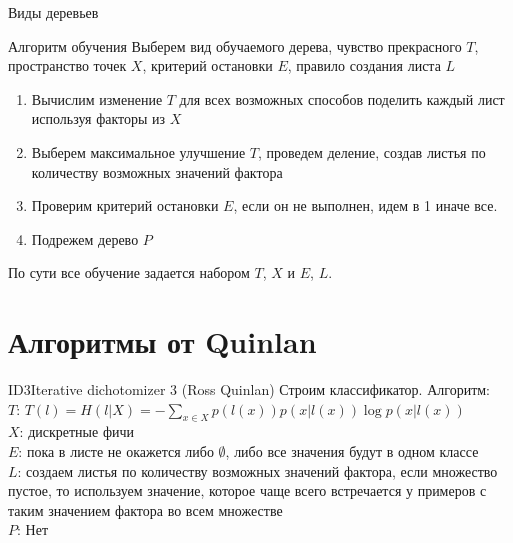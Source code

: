 \documentclass[14pt, fleqn, xcolor={dvipsnames, table}]{beamer}
\begin{document}
\begin{frame}{Виды деревьев}{}
\begin{center}
\end{center}
\end{frame}

\begin{frame}{Алгоритм обучения}
\small
Выберем вид обучаемого дерева, чувство прекрасного $T$, пространство точек $X$, критерий остановки $E$, правило создания листа $L$
\begin{enumerate}
  \item Вычислим изменение $T$ для всех возможных способов поделить каждый лист используя факторы из $X$
  \item Выберем максимальное улучшение $T$, проведем деление, создав листья по количеству возможных значений фактора
  \item Проверим критерий остановки $E$, если он не выполнен, идем в 1 иначе все.
  \item Подрежем дерево $P$
\end{enumerate}
По сути все обучение задается набором $T$, $X$ и $E$, $L$.
\end{frame}

\section{Алгоритмы от Quinlan}

\begin{frame}{ID3}{Iterative dichotomizer 3 (Ross Quinlan)}
\small
Строим классификатор. Алгоритм:\\
{\color{blue}$T$:} $T(l) = H(l|X) = -\sum_{x\in X} p(l(x)) p(x|l(x)) \log p(x|l(x))$\\
{\color{blue}$X$:} дискретные фичи \\
{\color{blue}$E$:} пока в листе не окажется либо $\emptyset$, либо все значения будут в одном классе \\
{\color{blue}$L$:} создаем листья по количеству возможных значений фактора, если множество пустое, то используем значение, которое чаще всего встречается у примеров с таким значением фактора во всем множестве \\
{\color{blue}$P$:} Нет
\end{frame}
\end{document}
